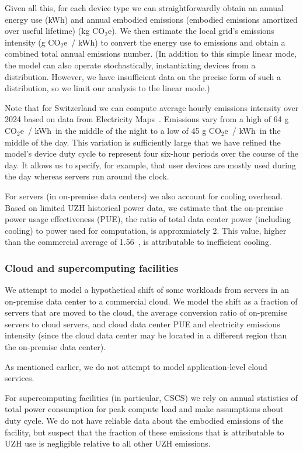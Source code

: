 \documentclass[11pt]{article}
\newcommand{\coe}{CO$_2$e}
\newcommand{\gcoe}{g \coe}
\newcommand{\kgcoe}{k\gcoe}
\newcommand{\gcoekwh}{\gcoe\ / kWh}
\begin{document}
Given all this, for each device type we can straightforwardly obtain an annual energy use (kWh) and annual embodied emissions (embodied emissions amortized over useful lifetime) (\kgcoe). We then estimate the local grid's emissions intensity (\gcoekwh) to convert the energy use to emissions and obtain a combined total annual emissions number. (In addition to this simple linear mode, the model can also operate stochastically, instantiating devices from a distribution. However, we have insufficient data on the precise form of such a distribution, so we limit our analysis to the linear mode.)

Note that for Switzerland we can compute average hourly emissions intensity over 2024 based on data from Electricity Maps~\cite{electricitymaps}. Emissions vary from a high of 64 \gcoekwh\ in the middle of the night to a low of 45 \gcoekwh\ in the middle of the day. This variation is sufficiently large that we have refined the model's device duty cycle to represent four six-hour periods over the course of the day. It allows us to specify, for example, that user devices are mostly used during the day whereas servers run around the clock.

For servers (in on-premise data centers) we also account for cooling overhead. Based on limited UZH historical power data, we estimate that the on-premise power usage effectiveness (PUE), the ratio of total data center power (including cooling) to power used for computation, is approxmiately 2. This value, higher than the commercial average of 1.56~\cite{google:datacenter:efficiency}, is attributable to inefficient cooling.

\subsubsection*{Cloud and supercomputing facilities}

We attempt to model a hypothetical shift of some workloads from servers in an on-premise data center to a commercial cloud. We model the shift as a fraction of servers that are moved to the cloud, the average conversion ratio of on-premise servers to cloud servers, and cloud data center PUE and electricity emissions intensity (since the cloud data center may be located in a different region than the on-premise data center).

As mentioned earlier, we do not attempt to model application-level cloud services.

For supercomputing facilities (in particular, CSCS) we rely on annual statistics of total power consumption for peak compute load and make assumptions about duty cycle. We do not have reliable data about the embodied emissions of the facility, but suspect that the fraction of these emissions that is attributable to UZH use is negligible relative to all other UZH emissions.
\end{document}
